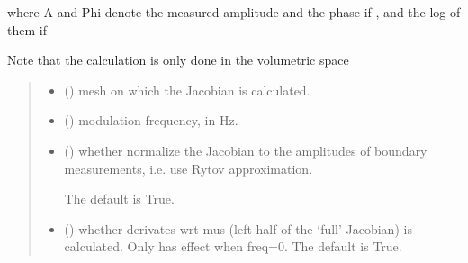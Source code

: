 \documentclass[letterpaper,10pt,english]{sphinxmanual}
\begin{document}
\begin{fulllineitems}
\begin{sphinxVerbatim}[commandchars=\\\{\}]
\PYG{p}{[}       \PYG{p}{]}
\end{sphinxVerbatim}

\sphinxAtStartPar
where A and Phi denote the measured amplitude and the phase if , and the log of them if 

\sphinxAtStartPar
Note that the calculation is only done in the volumetric space
\begin{quote}\begin{description}
\begin{itemize}
\item {} 
\sphinxAtStartPar
{} () \textendash{} mesh on which the Jacobian is calculated.

\item {} 
\sphinxAtStartPar
{} () \textendash{} modulation frequency, in Hz.

\item {} 
\sphinxAtStartPar
{} (\sphinxstyleliteralemphasis{\sphinxupquote{, }}) \textendash{} 
\sphinxAtStartPar
whether normalize the Jacobian to the amplitudes of boundary measurements, i.e. use Rytov approximation.

\sphinxAtStartPar
The default is True.


\item {} 
\sphinxAtStartPar
{} (\sphinxstyleliteralemphasis{\sphinxupquote{, }}) \textendash{} whether derivates wrt mus (left half of the ‘full’ Jacobian) is calculated. Only has effect when freq=0. The default is True.


\end{itemize}
\end{description}
\end{quote}
\end{fulllineitems}
\end{document}
